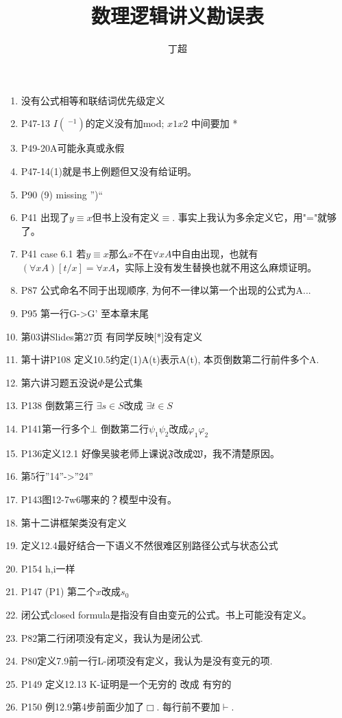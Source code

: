 \documentclass{article}
\begin{document}
\title{数理逻辑讲义勘误表}
\author{丁超}
\maketitle	
\begin{enumerate}
\item 没有公式相等和联结词优先级定义
\item P47-13 $I(~^{-1})$的定义没有加mod; $x1x2$ 中间要加 *
\item P49-20A可能永真或永假
\item P47-14(1)就是书上例题但又没有给证明。
\item P90 (9) missing ”)“
\item P41 出现了$y\equiv x$但书上没有定义$\equiv$. 事实上我认为多余定义它，用"="就够了。
\item P41 case 6.1 若$y\equiv x$那么$x$不在$\forall xA$中自由出现，也就有$(\forall xA)[t/x] = \forall xA$，实际上没有发生替换也就不用这么麻烦证明。
\item P87 公式命名不同于出现顺序, 为何不一律以第一个出现的公式为A...
\item P95 第一行G->G’ 至本章末尾
\item 第03讲Slides第27页 有同学反映[*]没有定义
\item 第十讲P108 定义10.5约定(1)A(t)表示A(t), 本页倒数第二行前件多个A. 
\item 第六讲习题五没说$\Phi$是公式集
\item P138 倒数第三行 $\exists s \in S$改成 $\exists t \in S$
\item P141第一行多个$\bot$ 倒数第二行$\psi_1 \psi_2$改成$\varphi_1 \varphi_2$
\item P136定义12.1 好像吴骏老师上课说$\mathfrak{F}$改成$\mathfrak{W}$，我不清楚原因。
\item 第5行”14”->”24”
\item P143图12-7w6哪来的？模型中没有。
\item 第十二讲框架类没有定义


\item 定义12.4最好结合一下语义不然很难区别路径公式与状态公式
\item P154 h,i一样
\item P147 (P1) 第二个$x$改成$s_0$
\item 闭公式closed formula是指没有自由变元的公式。书上可能没有定义。
\item P82第二行闭项没有定义，我认为是闭公式. 
\item P80定义7.9前一行L-闭项没有定义，我认为是没有变元的项. 
\item P149 定义12.13 K-证明是一个无穷的 改成 有穷的
\item P150 例12.9第4步前面少加了$\Box$. 每行前不要加$\vdash$. 
\end{enumerate}
\end{document}
